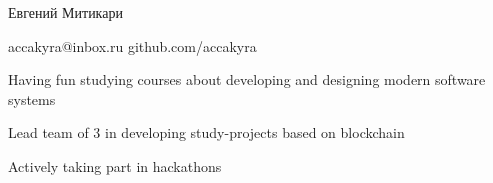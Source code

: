 \documentclass[]{cv-style}
\begin{document}
    \header

    \vspace{0.5cm}

    {\fontsize{40}{40} \hspace*{-1.1cm} \selectfont \color{white} {Евгений Митикари}}

    \vspace{0.5cm}

    {\color{white} \hspace*{-1cm} \LARGE{accakyra@inbox.ru}}
    {\color{white} \hspace*{1cm} \LARGE{github.com/accakyra}}

    \vspace{1.5cm}


    \vspace{0.2cm}
    \hspace*{0.7cm} {Having fun studying courses about developing and designing modern software systems}
    {\par}
    \hspace*{0.7cm} {Lead team of 3 in developing study-projects based on blockchain}
    {\par}
    \hspace*{0.7cm} {Actively taking part in hackathons}
    \vspace{0.3cm}
    {\newline}

    \vspace{1cm}

\end{document}
